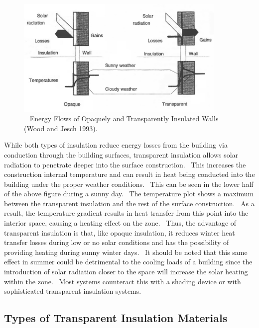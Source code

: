 \begin{figure}[hbtp] %
\centering
\includegraphics[width=0.9\textwidth, height=0.9\textheight, keepaspectratio=true]{media/image399.png}
\caption{  Energy Flows of Opaquely and Transparently Insulated Walls (Wood and Jesch 1993). \protect \label{fig:energy-flows-of-opaquely-and-transparently}}
\end{figure}

While both types of insulation reduce energy losses from the building via conduction through the building surfaces, transparent insulation allows solar radiation to penetrate deeper into the surface construction.~ This increases the construction internal temperature and can result in heat being conducted into the building under the proper weather conditions.~ This can be seen in the lower half of the above figure during a sunny day.~ The temperature plot shows a maximum between the transparent insulation and the rest of the surface construction.~ As a result, the temperature gradient results in heat transfer from this point into the interior space, causing a heating effect on the zone.~ Thus, the advantage of transparent insulation is that, like opaque insulation, it reduces winter heat transfer losses during low or no solar conditions and has the possibility of providing heating during sunny winter days.~ It should be noted that this same effect in summer could be detrimental to the cooling loads of a building since the introduction of solar radiation closer to the space will increase the solar heating within the zone.~ Most systems counteract this with a shading device or with sophisticated transparent insulation systems.

\subsection{Types of Transparent Insulation Materials}\label{types-of-transparent-insulation-materials}

